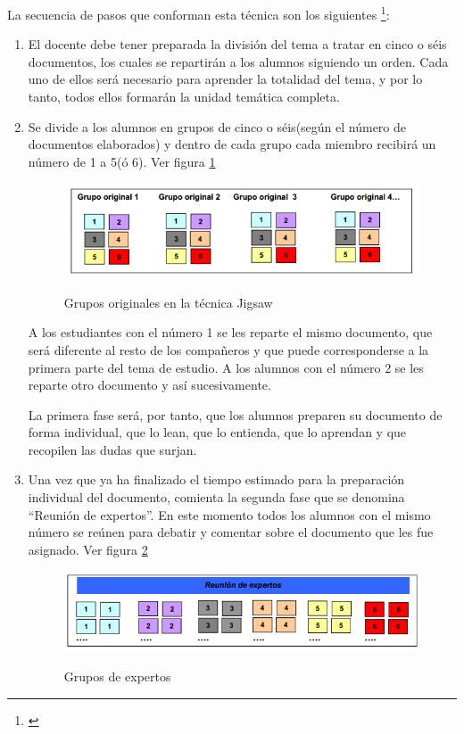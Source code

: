 La secuencia de pasos que conforman esta técnica son los siguientes \footnote{\cite{upm_2008}}:

\begin{enumerate}
  \item El docente debe tener preparada la división del tema a tratar en cinco o séis documentos, los cuales se repartirán a los alumnos siguiendo un orden. Cada uno de ellos será necesario para aprender la totalidad del tema, y por lo tanto, todos ellos formarán la unidad temática completa.
  \item Se divide a los alumnos en grupos de cinco o séis(según el número de documentos elaborados) y dentro de cada grupo cada miembro recibirá un número de 1 a 5(ó 6). Ver figura \ref{fig:jigsaw01}

\begin{figure}[h]
  \centering
  \includegraphics[scale=0.6]{figuras/jigsaw01.png}\\
  \caption{Grupos originales en la técnica Jigsaw}\label{fig:jigsaw01}
\end{figure}

A los estudiantes con el número 1 se les reparte el mismo documento, que será diferente al resto de los compañeros y que puede corresponderse a la primera parte del tema de estudio. A los alumnos con el número 2 se les reparte otro documento y así sucesivamente.

La primera fase será, por tanto, que los alumnos preparen su documento de forma individual, que lo lean, que lo entienda, que lo aprendan y que recopilen las dudas que surjan.

  \item Una vez que ya ha finalizado el tiempo estimado para la preparación individual del documento, comienta la segunda fase que se denomina ``Reunión de expertos''. En este momento todos los alumnos con el mismo número se reúnen para debatir y comentar sobre el documento que les fue asignado. Ver figura \ref{fig:jigsaw02}

  \begin{figure}[h]
  \centering
  \includegraphics[scale=0.6]{figuras/jigsaw02.png}\\
  \caption{Grupos de expertos}\label{fig:jigsaw02}
\end{figure}


\end{enumerate}

